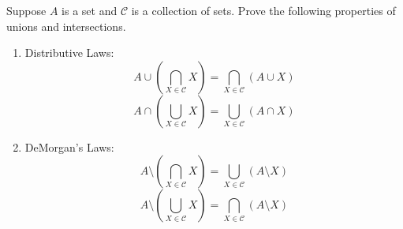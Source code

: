 \begin{exercise}
	Suppose $A$ is a set and $\mathscr{C}$ is a collection of sets. Prove the following properties of unions and intersections.
	\renewcommand{\labelenumi}{(\alph{enumi})}
	\begin{enumerate}
		\item Distributive Laws:
		\begin{equation*}
		A \cup \left(\bigcap_{X \in \mathscr{C}} X \right) = \bigcap_{X \in \mathscr{C}} \left( A \cup X \right)
		\end{equation*}
		\begin{equation*}
		A \cap \left( \bigcup_{X \in \mathscr{C}} X \right) = \bigcup_{X \in \mathscr{C}} \left( A \cap X \right)
		\end{equation*}
		\item DeMorgan's Laws:
		\begin{equation*}
		A \setminus \left( \bigcap_{X \in \mathscr{C}} X \right) = \bigcup_{X \in \mathscr{C}} \left( A \setminus X \right)
		\end{equation*}
		\begin{equation*}
		A \setminus \left( \bigcup_{X \in \mathscr{C}} X \right) = \bigcap_{X \in \mathscr{C}} \left( A \setminus X \right)
		\end{equation*}
	\end{enumerate}
\end{exercise}
